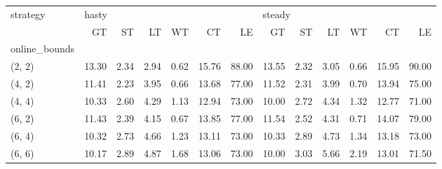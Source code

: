 \begin{tabular}{lrrrrrrrrrrrr}
\toprule
strategy & \multicolumn{6}{l}{hasty} & \multicolumn{6}{l}{steady} \\
{} &    GT &   ST &   LT &   WT &    CT &    LE &     GT &   ST &   LT &   WT &    CT &    LE \\
online\_bounds &       &      &      &      &       &       &        &      &      &      &       &       \\
\midrule
(2, 2)        & 13.30 & 2.34 & 2.94 & 0.62 & 15.76 & 88.00 &  13.55 & 2.32 & 3.05 & 0.66 & 15.95 & 90.00 \\
(4, 2)        & 11.41 & 2.23 & 3.95 & 0.66 & 13.68 & 77.00 &  11.52 & 2.31 & 3.99 & 0.70 & 13.94 & 75.00 \\
(4, 4)        & 10.33 & 2.60 & 4.29 & 1.13 & 12.94 & 73.00 &  10.00 & 2.72 & 4.34 & 1.32 & 12.77 & 71.00 \\
(6, 2)        & 11.43 & 2.39 & 4.15 & 0.67 & 13.85 & 77.00 &  11.54 & 2.52 & 4.31 & 0.71 & 14.07 & 79.00 \\
(6, 4)        & 10.32 & 2.73 & 4.66 & 1.23 & 13.11 & 73.00 &  10.33 & 2.89 & 4.73 & 1.34 & 13.18 & 73.00 \\
(6, 6)        & 10.17 & 2.89 & 4.87 & 1.68 & 13.06 & 73.00 &  10.00 & 3.03 & 5.66 & 2.19 & 13.01 & 71.50 \\
\bottomrule
\end{tabular}
